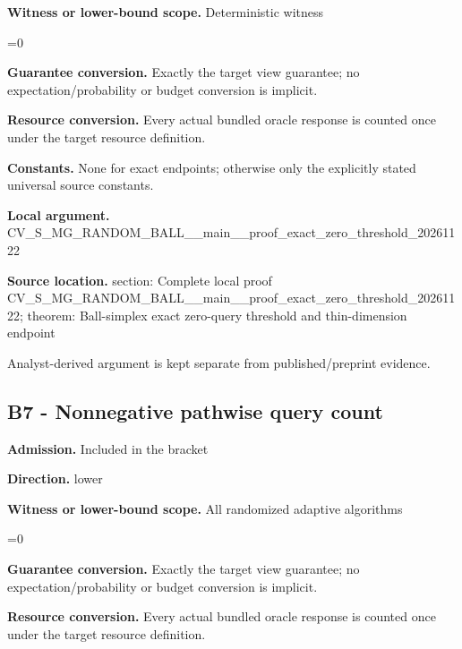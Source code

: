 \documentclass[10pt,a4paper]{article}
\newcommand{\AtlasMath}[1]{\par\begingroup\centering\setbox0=\hbox{$\displaystyle #1$}\ifdim\wd0>1.4\linewidth\typeout{ATLAS WIDE FORMULA: \the\wd0}\fi\ifdim\wd0>\linewidth\resizebox{\linewidth}{!}{\box0}\else\box0\fi\par\endgroup}
\begin{document}
\textbf{Witness or lower-bound scope.} Deterministic witness



\AtlasMath{0}


\textbf{Guarantee conversion.} Exactly the target view guarantee; no expectation/probability or budget conversion is implicit.



\textbf{Resource conversion.} Every actual bundled oracle response is counted once under the target resource definition.



\textbf{Constants.} None for exact endpoints; otherwise only the explicitly stated universal source constants.



\textbf{Local argument.} CV\_S\_MG\_RANDOM\_BALL\_\_mai\allowbreak{}n\_\_proof\_exact\_zero\_thre\allowbreak{}shold\_20261122



\textbf{Source location.}  section: Complete local proof CV\_S\_MG\_RANDOM\_BALL\_\_mai\allowbreak{}n\_\_proof\_exact\_zero\_thre\allowbreak{}shold\_20261122; theorem: Ball-simplex exact zero-query threshold and thin-dimension endpoint



Analyst-derived argument is kept separate from published/preprint evidence.



\subsection{B7 - Nonnegative pathwise query count}


\textbf{Admission.} Included in the bracket



\textbf{Direction.} lower



\textbf{Witness or lower-bound scope.} All randomized adaptive algorithms



\AtlasMath{0}


\textbf{Guarantee conversion.} Exactly the target view guarantee; no expectation/probability or budget conversion is implicit.



\textbf{Resource conversion.} Every actual bundled oracle response is counted once under the target resource definition.
\end{document}

